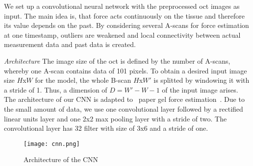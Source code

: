 

We set up a convolutional neural network with the preprocessed oct images as input.
The main idea is, that force acts continuously on the tissue and therefore its value depends on the past.
By considering several A-scans for force estimation at one timestamp, outliers are weakened and local connectivity between actual
measurement data and past data is created.

    \textit{Architecture} The image size of the oct is defined by the number of A-scans, whereby one A-scan contains data of 101 pixels.
To obtain a desired input image size $H$x$W$ for the model, the whole B-scan $H$x$W'$ is splitted by windowing it with a stride of 1.
Thus, a dimension of $D=W'-W-1$ of the input image arises.
The architecture of our CNN is adapted to ~paper gel force estimation~.
Due to the small amount of data, we use one convolutional layer followed by a rectified linear units layer and one 2x2 max pooling layer with a stride of two. 
The convolutional layer has 32 filter with size of 3x6 and a stride of one.

\begin{figure}
    \centering
    \texttt{[image: cnn.png]}
    \caption{Architecture of the CNN}
    \label{fig:cnn_archi}
\end{figure}

